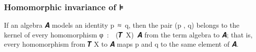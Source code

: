 \subsubsection{Homomorphic invariance of ⊧}\label{homomorphic-invariance-of}
If an algebra \ab 𝑨 models an identity \ab p~\af ≈~\ab q, then the pair (\ab p , \ab q) belongs to the kernel of every homomorphism \ab φ~\as :~~(\af 𝑻~\ab X)~\ab 𝑨 from the term algebra to \ab 𝑨; that is, every homomorphism from \af 𝑻 \ab X to \ab 𝑨 maps \ab p and \ab q to the same element of \ab 𝑨.
\ccpad
\begin{code}%
\>[0]\AgdaSpace{}%
\AgdaModule{\AgdaUnderscore{}}\AgdaSpace{}%
\AgdaSymbol{\{}\AgdaSpace{}%
\AgdaSpace{}%
\AgdaSymbol{:}\AgdaSpace{}%
\AgdaSymbol{\}\{}\AgdaSpace{}%
\AgdaSymbol{:}\AgdaSpace{}%
\AgdaSpace{}%
\AgdaSymbol{\}\{}\AgdaSpace{}%
\AgdaSymbol{:}\AgdaSpace{}%
\AgdaSpace{}%
\AgdaSpace{}%
\AgdaSymbol{(}\AgdaSpace{}%
\AgdaSymbol{)\}}\AgdaSpace{}%
\<%
\\
%
\\[\AgdaEmptyExtraSkip]%
\>[0][@{}l@{\AgdaIndent{0}}]%
\>[1]\AgdaSpace{}%
\AgdaSymbol{:}%
\>[969I]\AgdaSymbol{(}\AgdaSpace{}%
\AgdaSpace{}%
\AgdaSymbol{:}\AgdaSpace{}%
\AgdaSpace{}%
\AgdaSymbol{)(}\AgdaSpace{}%
\AgdaSymbol{:}\AgdaSpace{}%
\AgdaSpace{}%
\AgdaSpace{}%
\AgdaSymbol{)(}\AgdaSpace{}%
\AgdaSymbol{:}\AgdaSpace{}%
\AgdaSpace{}%
\AgdaSymbol{(}\AgdaSpace{}%
\AgdaSymbol{)}\AgdaSpace{}%
\AgdaSymbol{)}\<%
\\
\>[.][@{}l@{}]\<[969I]%
\>[18]\AgdaComment{-------------------------------------------------}\<%
\\
\>[1][@{}l@{\AgdaIndent{0}}]%
\>[2]%
\>[18]\AgdaSpace{}%
\AgdaSpace{}%
\AgdaSpace{}%
\AgdaSpace{}%
%
\>[29]%
\>[32]\AgdaSpace{}%
\AgdaSpace{}%
\AgdaSpace{}%
\AgdaSpace{}%
\AgdaSpace{}%
\AgdaSpace{}%
\AgdaSpace{}%
\AgdaSpace{}%

\end{code}
